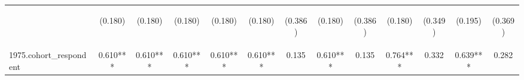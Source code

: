 \begin{center}
\begin{tabular}{lcccccccccccc}
\vspace{4pt} & \begin{footnotesize}(0.180)\end{footnotesize} & \begin{footnotesize}(0.180)\end{footnotesize} & \begin{footnotesize}(0.180)\end{footnotesize} & \begin{footnotesize}(0.180)\end{footnotesize} & \begin{footnotesize}(0.180)\end{footnotesize} & \begin{footnotesize}(0.386)\end{footnotesize} & \begin{footnotesize}(0.180)\end{footnotesize} & \begin{footnotesize}(0.386)\end{footnotesize} & \begin{footnotesize}(0.180)\end{footnotesize} & \begin{footnotesize}(0.349)\end{footnotesize} & \begin{footnotesize}(0.195)\end{footnotesize} & \begin{footnotesize}(0.369)\end{footnotesize} \\
1975.cohort\_respondent & 0.610*** & 0.610*** & 0.610*** & 0.610*** & 0.610*** & 0.135 & 0.610*** & 0.135 & 0.764*** & 0.332 & 0.639*** & 0.282 \\

\end{tabular}
\end{center}
